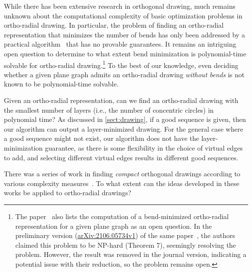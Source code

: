 \documentclass{article}\usepackage[a4paper,margin=20mm]{geometry}
\begin{document}
 

While there has been extensive research in orthogonal drawing, much remains unknown about the computational complexity of basic optimization problems in ortho-radial drawing. In particular, the problem of finding an ortho-radial representation that minimizes the number of bends has only been addressed by a practical algorithm~\cite{niedermann2020integer} that has no provable guarantees. It remains an intriguing open question to determine to what extent bend minimization is polynomial-time solvable for ortho-radial drawing.\footnote{The paper~\cite{barth2023topology} also lists the computation of a bend-minimized ortho-radial representation for a given plane graph as an open question. In the preliminary version (\href{https://arxiv.org/abs/2106.05734v1}{arXiv:2106.05734v1}) of the same paper~\cite{barth2023topology}, the authors claimed this problem to be NP-hard (Theorem 7), seemingly resolving the problem. However, the result was removed in the journal version, indicating a potential issue with their reduction, so the problem remains open.} To the best of our knowledge, even deciding whether a given plane graph admits an ortho-radial drawing \emph{without bends} is not known to be polynomial-time solvable.


Given an ortho-radial representation, can we find an ortho-radial drawing with the smallest number of layers (i.e., the number of concentric circles) in polynomial time? As discussed in \cref{sect:drawing}, if a good sequence is given, then our algorithm can output a layer-minimized drawing. For the general case where a good sequence might not exist, our algorithm does not have the layer-minimization guarantee, as there is some flexibility in the choice of virtual edges to add, and selecting different virtual edges results in different good sequences. 

There was a series of work in finding \emph{compact} orthogonal drawings according to various complexity measures~\cite{JGAA-595,bridgeman2000turn,JGAA-263,klau1999optimal,patrignani2001complexity}. To what extent can the ideas developed in these works be applied to ortho-radial drawings?




\appendix
\end{document}
